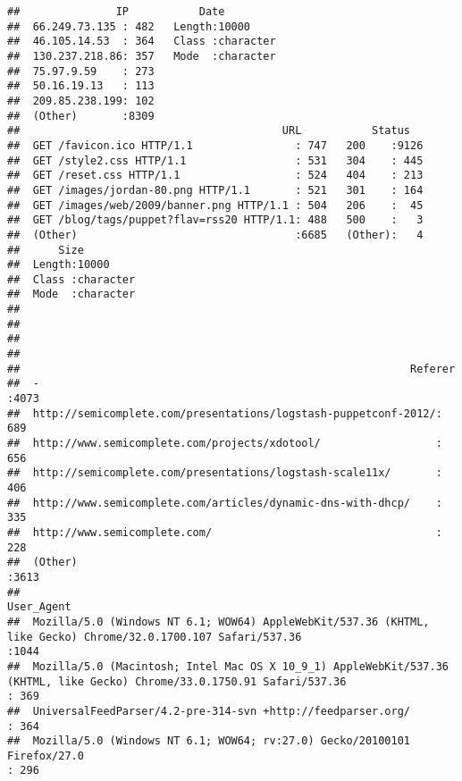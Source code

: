 \documentclass[]{article}
\begin{document}
\begin{verbatim}
##               IP           Date          
##  66.249.73.135 : 482   Length:10000      
##  46.105.14.53  : 364   Class :character  
##  130.237.218.86: 357   Mode  :character  
##  75.97.9.59    : 273                     
##  50.16.19.13   : 113                     
##  209.85.238.199: 102                     
##  (Other)       :8309                     
##                                         URL           Status    
##  GET /favicon.ico HTTP/1.1                : 747   200    :9126  
##  GET /style2.css HTTP/1.1                 : 531   304    : 445  
##  GET /reset.css HTTP/1.1                  : 524   404    : 213  
##  GET /images/jordan-80.png HTTP/1.1       : 521   301    : 164  
##  GET /images/web/2009/banner.png HTTP/1.1 : 504   206    :  45  
##  GET /blog/tags/puppet?flav=rss20 HTTP/1.1: 488   500    :   3  
##  (Other)                                  :6685   (Other):   4  
##      Size          
##  Length:10000      
##  Class :character  
##  Mode  :character  
##                    
##                    
##                    
##                    
##                                                             Referer    
##  -                                                              :4073  
##  http://semicomplete.com/presentations/logstash-puppetconf-2012/: 689  
##  http://www.semicomplete.com/projects/xdotool/                  : 656  
##  http://semicomplete.com/presentations/logstash-scale11x/       : 406  
##  http://www.semicomplete.com/articles/dynamic-dns-with-dhcp/    : 335  
##  http://www.semicomplete.com/                                   : 228  
##  (Other)                                                        :3613  
##                                                                                                                                                                                                 User_Agent  
##  Mozilla/5.0 (Windows NT 6.1; WOW64) AppleWebKit/537.36 (KHTML, like Gecko) Chrome/32.0.1700.107 Safari/537.36                                                                                       :1044  
##  Mozilla/5.0 (Macintosh; Intel Mac OS X 10_9_1) AppleWebKit/537.36 (KHTML, like Gecko) Chrome/33.0.1750.91 Safari/537.36                                                                             : 369  
##  UniversalFeedParser/4.2-pre-314-svn +http://feedparser.org/                                                                                                                                         : 364  
##  Mozilla/5.0 (Windows NT 6.1; WOW64; rv:27.0) Gecko/20100101 Firefox/27.0                                                                                                                            : 296  

\end{verbatim}
\end{document}
